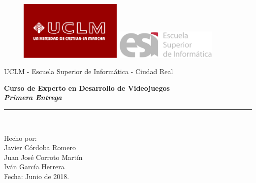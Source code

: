 \documentclass[11pt, twoside]{article}
\begin{document}
\begin{titlepage}
\begin{center}
\vspace*{-1in}
\begin{figure}[htb]
\begin{center}
\includegraphics[width=5cm]{./images/uclm_logo.eps} 
\hspace*{1.5in}
\includegraphics[width=5cm]{./images/esi_logo.eps}
\end{center}
\end{figure}
\end{center}
\begin{center}
UCLM - Escuela Superior de Informática - Ciudad Real\\
\vspace*{0.6in}
\vspace*{0.2in}
\begin{Large}
\textbf{Curso de Experto en Desarrollo de Videojuegos} \\
\textbf{\textit{Primera Entrega}} \\
\end{Large}
\vspace*{0.3in}
\vspace*{0.3in}
\rule{80mm}{0.1mm}\\
\vspace*{0.1in}
\begin{large}
Hecho por: \\
Javier Córdoba Romero \\
Juan José Corroto Martín \\
Iván García Herrera \\
\vspace*{0.3in}
Fecha: Junio de 2018.\\
\end{large}
\end{center}

\end{titlepage}
\tableofcontents
\newpage
\end{document}
